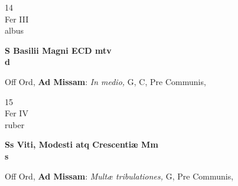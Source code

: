 \documentclass[10pt, openany]{book}
\begin{document}
        \begin{center}
            \begin{minipage}{3.5in}
                \vspace{2em}
                \begin{minipage}{0.5in}
                    {\Huge 14} \\
                    {\normalsize Fer III} \\
                    {\normalsize albus}
                \end{minipage}
                \begin{minipage}{3.0in}
                    \textbf{ \large S Basilii Magni ECD mtv \\
                    \textnormal{\normalsize d}} \\ 
                \end{minipage}
                \begin{justify}Off Ord, \textbf{Ad Missam}: \textit{In medio,} G, C, Pre Communis,   
                \end{justify}
            \end{minipage}
        \end{center}
    
        \begin{center}
            \begin{minipage}{3.5in}
                \vspace{2em}
                \begin{minipage}{0.5in}
                    {\Huge 15} \\
                    {\normalsize Fer IV} \\
                    {\normalsize ruber}
                \end{minipage}
                \begin{minipage}{3.0in}
                    \textbf{ \large Ss Viti, Modesti atq Crescentiæ Mm \\
                    \textnormal{\normalsize s}} \\ 
                \end{minipage}
                \begin{justify}Off Ord, \textbf{Ad Missam}: \textit{Multæ tribulationes,} G, Pre Communis,   
                \end{justify}
            \end{minipage}
        \end{center}
    
\end{document}
